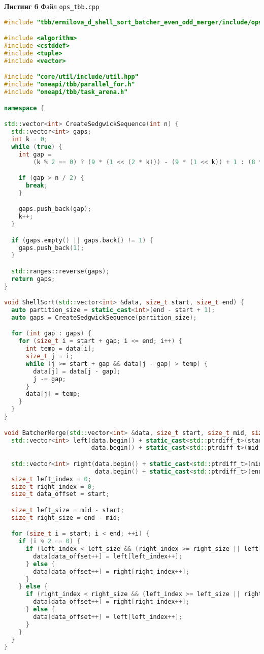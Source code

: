 \documentclass[a4paper,12pt]{article}
\begin{document}
\textbf{Листинг 6} Файл \texttt{ops\_tbb.cpp}
\begin{lstlisting}[language=C++]
#include "tbb/ermilova_d_shell_sort_batcher_even_odd_merger/include/ops_tbb.hpp"

#include <algorithm>
#include <cstddef>
#include <tuple>
#include <vector>

#include "core/util/include/util.hpp"
#include "oneapi/tbb/parallel_for.h"
#include "oneapi/tbb/task_arena.h"

namespace {

std::vector<int> CreateSedgwickSequence(int n) {
  std::vector<int> gaps;
  int k = 0;
  while (true) {
    int gap =
        (k % 2 == 0) ? (9 * (1 << (2 * k))) - (9 * (1 << k)) + 1 : (8 * (1 << k)) - (6 * (1 << ((k + 1) / 2))) + 1;

    if (gap > n / 2) {
      break;
    }

    gaps.push_back(gap);
    k++;
  }

  if (gaps.empty() || gaps.back() != 1) {
    gaps.push_back(1);
  }

  std::ranges::reverse(gaps);
  return gaps;
}

void ShellSort(std::vector<int> &data, size_t start, size_t end) {
  auto partition_size = static_cast<int>(end - start + 1);
  auto gaps = CreateSedgwickSequence(partition_size);

  for (int gap : gaps) {
    for (size_t i = start + gap; i <= end; i++) {
      int temp = data[i];
      size_t j = i;
      while (j >= start + gap && data[j - gap] > temp) {
        data[j] = data[j - gap];
        j -= gap;
      }
      data[j] = temp;
    }
  }
}

void BatcherMerge(std::vector<int> &data, size_t start, size_t mid, size_t end) {
  std::vector<int> left(data.begin() + static_cast<std::ptrdiff_t>(start),
                        data.begin() + static_cast<std::ptrdiff_t>(mid));

  std::vector<int> right(data.begin() + static_cast<std::ptrdiff_t>(mid),
                         data.begin() + static_cast<std::ptrdiff_t>(end));
  size_t left_index = 0;
  size_t right_index = 0;
  size_t data_offset = start;

  size_t left_size = mid - start;
  size_t right_size = end - mid;

  for (size_t i = start; i < end; ++i) {
    if (i % 2 == 0) {
      if (left_index < left_size && (right_index >= right_size || left[left_index] <= right[right_index])) {
        data[data_offset++] = left[left_index++];
      } else {
        data[data_offset++] = right[right_index++];
      }
    } else {
      if (right_index < right_size && (left_index >= left_size || right[right_index] <= left[left_index])) {
        data[data_offset++] = right[right_index++];
      } else {
        data[data_offset++] = left[left_index++];
      }
    }
  }
}


\end{lstlisting}
\end{document}
